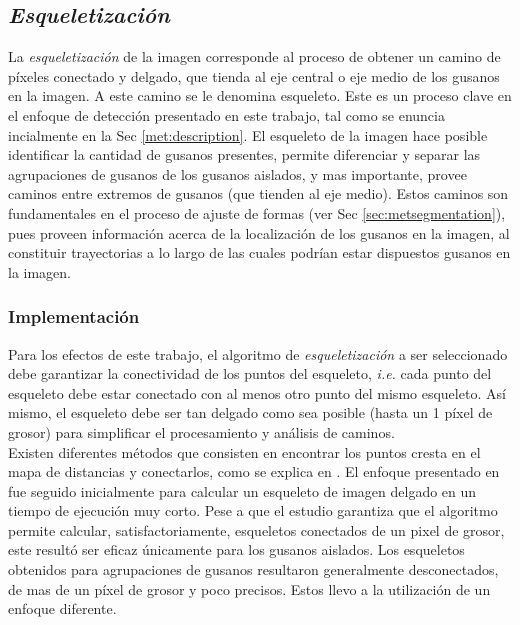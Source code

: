\subsection{\emph{Esqueletizaci\'on}}
\label{sec:metsk}

La \emph{esqueletizaci\'on} de la imagen corresponde al proceso de obtener un 
camino de p\'ixeles conectado y delgado, que tienda
al eje central o eje medio de los gusanos en la imagen. A este camino se le
denomina esqueleto. Este es un proceso
clave en el enfoque de detecci\'on presentado en este trabajo, tal como
se enuncia incialmente en la Sec \ref{met:description}. El esqueleto de la
imagen hace posible identificar la cantidad de gusanos presentes, permite
diferenciar y separar las agrupaciones de gusanos de los gusanos aislados, 
y mas importante, provee caminos entre extremos de gusanos (que tienden
al eje medio). Estos caminos son fundamentales en el proceso de ajuste
de formas (ver Sec \ref{sec:metsegmentation}), pues proveen informaci\'on
acerca de la localizaci\'on de los gusanos en la imagen, al constituir trayectorias
a lo largo de las cuales podr\'ian estar dispuestos gusanos en la imagen.

\subsubsection*{Implementaci\'on}
\label{sec:skeletonimp}


Para los efectos de este trabajo, el algoritmo de \emph{esqueletizaci\'on} a ser
seleccionado debe garantizar la conectividad de los puntos del esqueleto, \emph{i.e.}
cada punto del esqueleto debe estar conectado con al menos otro punto del mismo
esqueleto. As\'i mismo, el esqueleto debe ser tan delgado como sea posible 
(hasta un 1 p\'ixel de grosor) para simplificar el procesamiento y an\'alisis de caminos.\\

Existen diferentes m\'etodos que consisten en encontrar los puntos cresta en el
mapa de distancias y conectarlos, como se explica en \cite{maxima,euclideancentre,ridgedt}. 
El enfoque presentado en \cite{maxima} fue seguido inicialmente para calcular un esqueleto
de imagen delgado en un tiempo de ejecuci\'on muy corto. Pese a que el estudio garantiza
que el algoritmo permite calcular, satisfactoriamente, esqueletos conectados de un pixel
de grosor, este result\'o ser eficaz \'unicamente para los gusanos aislados. Los esqueletos
obtenidos para agrupaciones de gusanos resultaron generalmente desconectados, 
de mas de un p\'ixel de grosor y poco precisos. Estos llevo a la utilizaci\'on
de un enfoque diferente.\\

